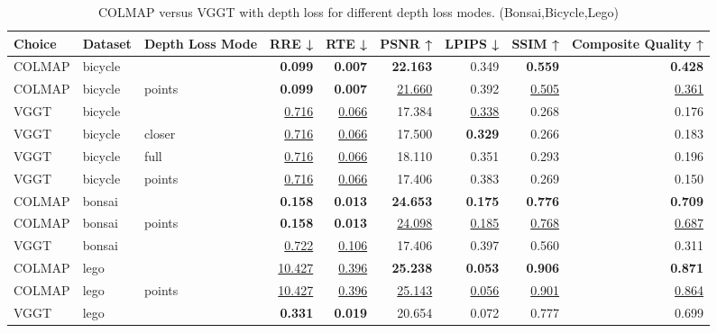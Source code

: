 \begin{table}[H]
\caption{COLMAP versus VGGT with depth loss for different depth loss modes. (Bonsai,Bicycle,Lego)}
\label{tab:05_depth_loss_mode_bonsai,bicycle,lego}
\small
\begin{tabular}{lllrrrrrr}
\toprule
Choice & Dataset & Depth Loss Mode & RRE ↓ & RTE ↓ & PSNR ↑ & LPIPS ↓ & SSIM ↑ & Composite Quality ↑ \\
\midrule
COLMAP & bicycle &  & \textbf{0.099} & \textbf{0.007} & \textbf{22.163} & 0.349 & \textbf{0.559} & \textbf{0.428} \\
COLMAP & bicycle & points & \textbf{0.099} & \textbf{0.007} & \underline{21.660} & 0.392 & \underline{0.505} & \underline{0.361} \\
VGGT & bicycle &  & \underline{0.716} & \underline{0.066} & 17.384 & \underline{0.338} & 0.268 & 0.176 \\
VGGT & bicycle & closer & \underline{0.716} & \underline{0.066} & 17.500 & \textbf{0.329} & 0.266 & 0.183 \\
VGGT & bicycle & full & \underline{0.716} & \underline{0.066} & 18.110 & 0.351 & 0.293 & 0.196 \\
VGGT & bicycle & points & \underline{0.716} & \underline{0.066} & 17.406 & 0.383 & 0.269 & 0.150 \\
\midrule
COLMAP & bonsai &  & \textbf{0.158} & \textbf{0.013} & \textbf{24.653} & \textbf{0.175} & \textbf{0.776} & \textbf{0.709} \\
COLMAP & bonsai & points & \textbf{0.158} & \textbf{0.013} & \underline{24.098} & \underline{0.185} & \underline{0.768} & \underline{0.687} \\
VGGT & bonsai &  & \underline{0.722} & \underline{0.106} & 17.406 & 0.397 & 0.560 & 0.311 \\
\midrule
COLMAP & lego &  & \underline{10.427} & \underline{0.396} & \textbf{25.238} & \textbf{0.053} & \textbf{0.906} & \textbf{0.871} \\
COLMAP & lego & points & \underline{10.427} & \underline{0.396} & \underline{25.143} & \underline{0.056} & \underline{0.901} & \underline{0.864} \\
VGGT & lego &  & \textbf{0.331} & \textbf{0.019} & 20.654 & 0.072 & 0.777 & 0.699 \\
\bottomrule
\end{tabular}
\end{table}